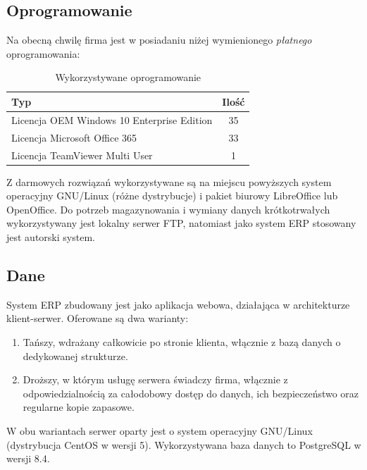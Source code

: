 \documentclass{article}
\begin{document}
        \subsection{Oprogramowanie}
            Na obecną chwilę firma jest w posiadaniu niżej wymienionego \textit{płatnego} oprogramowania:
            \begin{table}[H]
                \centering
                \begin{tabular}{ | l | c | }
                    \hline
                    \textbf{Typ} & \textbf{Ilość} \\
                    \hline
                    Licencja OEM Windows 10 Enterprise Edition & 35 \\
                    \hline
                    Licencja Microsoft Office 365 & 33 \\
                    \hline
                    Licencja TeamViewer Multi User & 1 \\
                    \hline
                \end{tabular}
                \caption{Wykorzystywane oprogramowanie}
            \end{table}

            Z darmowych rozwiązań wykorzystywane są na miejscu powyższych system operacyjny GNU/Linux (różne dystrybucje) i pakiet biurowy LibreOffice lub OpenOffice.
            Do potrzeb magazynowania i wymiany danych krótkotrwałych wykorzystywany jest lokalny serwer FTP, natomiast jako system ERP stosowany jest autorski system.
        \subsection{Dane}
            System ERP zbudowany jest jako aplikacja webowa, działająca w architekturze klient-serwer.
            Oferowane są dwa warianty:
            \begin{enumerate}
                \item Tańszy, wdrażany całkowicie po stronie klienta, włącznie z bazą danych o dedykowanej strukturze.
                \item Droższy, w którym usługę serwera świadczy firma, włącznie z odpowiedzialnością za całodobowy dostęp do danych, ich bezpieczeństwo oraz regularne kopie zapasowe.
            \end{enumerate}
            W obu wariantach serwer oparty jest o system operacyjny GNU/Linux (dystrybucja CentOS w wersji 5).
            Wykorzystywana baza danych to PostgreSQL w wersji 8.4.
\end{document}
